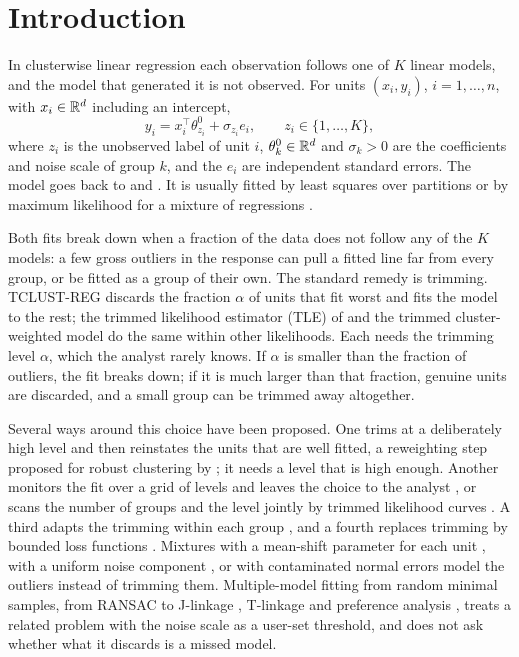 \section{Introduction}
\label{sec:intro}

In clusterwise linear regression each observation follows one of $K$ linear models, and the
model that generated it is not observed. For units $(x_i,y_i)$, $i=1,\dots,n$, with $x_i\in\mathbb{R}^{d}$
including an intercept,
\begin{equation}
y_i=x_i^{\top}\theta^{0}_{z_i}+\sigma_{z_i}e_i,\qquad z_i\in\{1,\dots,K\},
\label{eq:model}
\end{equation}
where $z_i$ is the unobserved label of unit $i$, $\theta^{0}_k\in\mathbb{R}^{d}$ and $\sigma_k>0$ are
the coefficients and noise scale of group $k$, and the $e_i$ are independent standard errors.
The model goes back to \citet{quandt1972switching} and \citet{spath1979algorithm}. It is
usually fitted by least squares over partitions or by maximum likelihood for a mixture of
regressions \citep{desarbo1988maximum,deveaux1989mixtures}.

Both fits break down when a fraction of the data does not follow any of the $K$ models: a few
gross outliers in the response can pull a fitted line far from every group, or be fitted as a
group of their own. The standard remedy is trimming. TCLUST-REG
\citep{garciaescudero2010robust} discards the fraction $\alpha$ of units that fit worst and
fits the model to the rest; the trimmed likelihood estimator (TLE) of \citet{neykov2007robust} and the
trimmed cluster-weighted model \citep{garciaescudero2017robust} do the same within other
likelihoods. Each needs the trimming level $\alpha$, which the analyst rarely knows. If $\alpha$
is smaller than the fraction of outliers, the fit breaks down; if it is much larger than that
fraction, genuine units are discarded, and a small group can be trimmed away altogether.

Several ways around this choice have been proposed. One trims at a deliberately high level
and then reinstates the units that are well fitted, a reweighting step proposed for robust
clustering by \citet{dotto2018reweighting}; it needs a level that is high enough. Another
monitors the fit over a grid of levels and leaves the choice to the analyst
\citep{torti2019assessing,riani2008fitting}, or scans the number of groups and the level
jointly by trimmed likelihood curves \citep{garciaescudero2011exploring,cerioli2018finding}.
A third adapts the trimming within each group \citep{chang2020componentwise}, and a fourth
replaces trimming by bounded loss functions \citep{bai2012robust}. Mixtures with a mean-shift
parameter for each unit \citep{yu2017new}, with a uniform noise component
\citep{banfield1993model}, or with contaminated normal errors
\citep{punzo2017robust,mazza2020mixtures} model the outliers instead of trimming them. Multiple-model
fitting from random minimal samples, from RANSAC
\citep{fischler1981random} to J-linkage \citep{toldo2008robust}, T-linkage
\citep{magri2014tlinkage} and preference analysis \citep{magri2015robust}, treats a related
problem with the noise scale as a user-set threshold, and does not ask whether what it
discards is a missed model.

